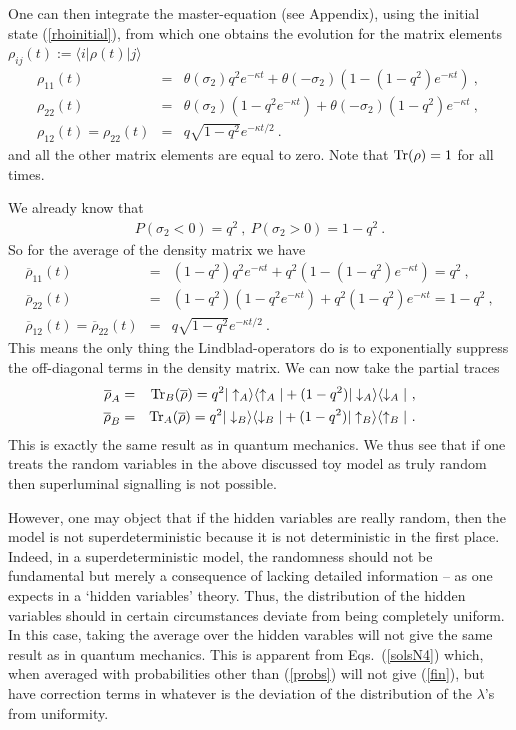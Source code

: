 \documentclass[12pt]{article}
\def\beqn{\begin{eqnarray}}
\def\eeqn{\end{eqnarray}}
\begin{document}
One can then integrate the master-equation (see Appendix), using the initial state (\ref{rhoinitial}), from which one obtains  the evolution for the matrix elements $\rho_{ij}(t):=\langle i|\rho(t)|j\rangle$
\beqn
\rho_{11}(t) &=& \theta(\sigma_2) q^2 e^{- \kappa t}  + \theta(-\sigma_2) \left(1 - \left(1-q^2 \right)e^{ -\kappa t}  \right) ~,~\nonumber \\
 \rho_{22}(t) &=& \theta(\sigma_2) (1-  q^2 e^{- \kappa t}) + \theta(-\sigma_2) \left( 1 - q^2 \right) e^{ -\kappa t}
~,\nonumber \\
\rho_{12}(t) =\rho_{22}(t) &=& q\sqrt{1-q^2} e^{- \kappa t/2} ~. \label{solsN4}
\eeqn
and all the other matrix elements are equal to zero. Note that  ${\rm Tr}(\rho) = 1$ for all times. 
 
We already know that
\beqn
P(\sigma_2 < 0) = q^2~,~P(\sigma_2 > 0) = 1-q^2~. \label{probs}
\eeqn
So for the average of the density matrix 
we have
\beqn
\overline \rho_{11}(t) &=& (1-q^2) q^2 e^{- \kappa t}  + q^2 \left(1 - \left(1-q^2 \right)e^{ - \kappa t}  \right) = q^2 ~, \nonumber \\
\overline \rho_{22}(t) &=& (1-q^2)(1-  q^2 e^{- \kappa t})  + q^2\left( 1 - q^2 \right) e^{ -\kappa t} = 1- q^2 ~, \nonumber \\
\overline \rho_{12}(t) = \overline \rho_{22}(t) &=& q\sqrt{1-q^2} e^{- \kappa t/2} ~. \label{fin}
\eeqn
This means the only thing the Lindblad-operators do is to exponentially suppress the off-diagonal terms in the density matrix. 
We can now take the partial traces
\beqn
\overline \rho_A &=& {\rm Tr}_B (\overline \rho) = q^2  |\uparrow_{A} \rangle \langle  \uparrow_{A} | + (1-q^2) |\downarrow_{A} \rangle \langle  \downarrow_{A} | ~,\\
\overline \rho_B &=& {\rm Tr}_A (\overline \rho) = q^2  |\downarrow_{B} \rangle \langle  \downarrow_{B} | + (1-q^2) |\uparrow_{B} \rangle \langle  \uparrow_{B} | ~.
\eeqn
This is exactly the same result as in quantum mechanics.
We thus see that if one treats the random variables in the above discussed toy model as truly random then superluminal signalling is not possible. 

However, one may object that if the hidden variables are really random, then the model is not superdeterministic because it is not deterministic in the first place. Indeed, in a superdeterministic model, the randomness should not be fundamental but merely a consequence of lacking detailed information -- as one expects in a `hidden variables' theory. Thus, the distribution of the hidden variables should in certain circumstances deviate from being completely uniform. In this case, taking the average over the hidden varables will not give the same result as in quantum mechanics. This is apparent from Eqs.\ (\ref{solsN4}) which, when averaged with probabilities other than (\ref{probs}) will not give (\ref{fin}), but have correction terms in whatever is the deviation of the distribution of the $\lambda$'s from uniformity.
\end{document}
